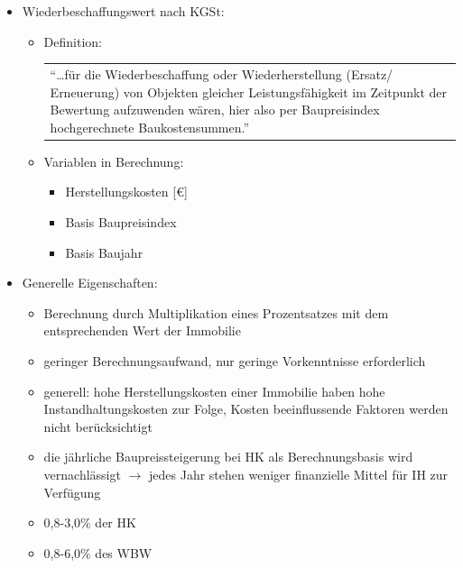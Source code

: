 \documentclass[fleqn,twoside,dvipsnames]{article}
\begin{document}
\begin{itemize}
\begin{itemize}
                    \item Wiederbeschaffungswert nach KGSt:
                        \begin{itemize}
                            \item Definition:\\
                                \begin{tabular}{|p{13cm}}\enquote{…für die Wiederbeschaffung oder Wiederherstellung (Ersatz/ Erneuerung) von Objekten gleicher Leistungsfähigkeit im Zeitpunkt der Bewertung aufzuwenden wären, hier also per Baupreisindex hochgerechnete Baukostensummen.}\end{tabular} \vspace{1.5mm}
                            \item Variablen in Berechnung:
                                \begin{itemize}
                                    \item Herstellungskosten [€]
                                    \item Basis Baupreisindex
                                    \item Basis Baujahr
                                \end{itemize}
                        \end{itemize}
                    \item Generelle Eigenschaften:
                        \begin{itemize}
                            \item Berechnung durch Multiplikation eines Prozentsatzes mit dem entsprechenden Wert der Immobilie
                            \item geringer Berechnungsaufwand, nur geringe Vorkenntnisse erforderlich
                            \item generell: hohe Herstellungskosten einer Immobilie haben hohe Instandhaltungskosten zur Folge, Kosten beeinflussende Faktoren werden nicht berücksichtigt
                            \item die jährliche Baupreissteigerung bei $\mathrm{HK}$ als Berechnungsbasis wird vernachlässigt $\rightarrow$ jedes Jahr stehen weniger finanzielle Mittel für IH zur Verfügung
                            \item 0,8-3,0\% der HK
                            \item 0,8-6,0\% des WBW
                        \end{itemize}

\end{itemize}
\end{itemize}
\end{document}
